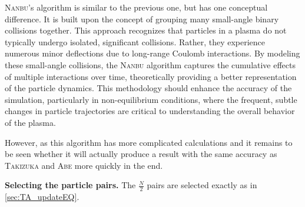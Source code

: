 \textsc{Nanbu}'s algorithm is similar to the previous one, but has one conceptual difference. It is built upon the concept of grouping many small-angle binary collisions together. This approach recognizes that particles in a plasma do not typically undergo isolated, significant collisions. Rather, they experience numerous minor deflections due to long-range Coulomb interactions. By modeling these small-angle collisions, the \textsc{Nanbu} algorithm captures the cumulative effects of multiple interactions over time, theoretically providing a better representation of the particle dynamics. This methodology should enhance the accuracy of the simulation, particularly in non-equilibrium conditions, where the frequent, subtle changes in particle trajectories are critical to understanding the overall behavior of the plasma. 

However, as this algorithm has more complicated calculations and it remains to be seen whether it will actually produce a result with the same accuracy as \textsc{Takizuka} and \textsc{Abe} more quickly in the end.

\textbf{Selecting the particle pairs.} The $\frac{N}{2}$ pairs are selected exactly as in \ref{sec:TA_updateEQ}.

